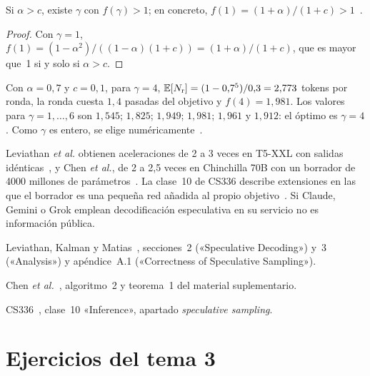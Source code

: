 \begin{corolario}\label{cor:alpha-c}
Si $\alpha>c$, existe $\gamma$ con $f(\gamma)>1$; en concreto, $f(1)=(1+\alpha)/(1+c)>1$~\cite[corolario~3.9]{leviathan}.
\end{corolario}

\begin{proof}
Con $\gamma=1$, $f(1)=(1-\alpha^{2})/((1-\alpha)(1+c))=(1+\alpha)/(1+c)$, que es mayor que~1 si y solo si $\alpha>c$.
\end{proof}

\begin{ejemplo}\label{ej:gamma}
Con $\alpha=0{,}7$ y $c=0{,}1$, para $\gamma=4$, $\mathbb{E}[N_{\mathrm{r}}]=(1-0{,}7^{5})/0{,}3=2{,}773$ tokens por ronda, la ronda cuesta $1{,}4$ pasadas del objetivo y $f(4)=1{,}981$. Los valores para $\gamma=1,\dots,6$ son $1{,}545$; $1{,}825$; $1{,}949$; $1{,}981$; $1{,}961$ y $1{,}912$: el óptimo es $\gamma=4$. Como $\gamma$ es entero, se elige numéricamente~\cite[§3.5]{leviathan}.
\end{ejemplo}

\begin{observacion}
Leviathan \emph{et al.} obtienen aceleraciones de 2 a 3 veces en T5-XXL con salidas idénticas~\cite{leviathan}, y Chen \emph{et al.}, de 2 a 2{,}5 veces en Chinchilla 70B con un borrador de 4000 millones de parámetros~\cite{chen}. La clase~10 de CS336 describe extensiones en las que el borrador es una pequeña red añadida al propio objetivo~\cite{cs336}. Si Claude, Gemini o Grok emplean decodificación especulativa en su servicio no es información pública.
\end{observacion}

\begin{lecturas}
\item Leviathan, Kalman y Matias~\cite{leviathan}, secciones~2 («Speculative Decoding») y~3 («Analysis») y apéndice~A.1 («Correctness of Speculative Sampling»).
\item Chen \emph{et al.}~\cite{chen}, algoritmo~2 y teorema~1 del material suplementario.
\item CS336~\cite{cs336}, clase~10 «Inference», apartado \emph{speculative sampling}.
\end{lecturas}

\section*{Ejercicios del tema 3}

